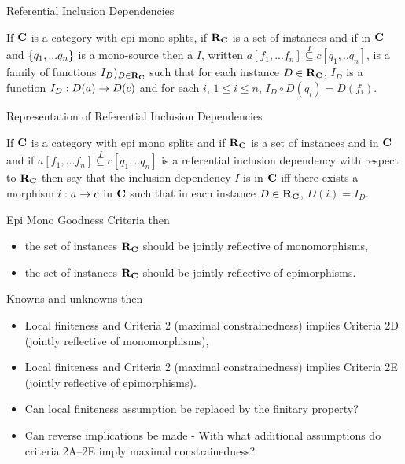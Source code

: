 \documentclass[xcolor=pst,dvips]{beamer}   %
\begin{document}
\begin{frame}{Referential Inclusion Dependencies}
\begin{definition}
If $\textbf{C}$ is a category with epi mono splits, if $\textbf{R}_{\textbf{C}}$ is a set of instances 
and if \fnsourceqnsource in $\textbf{C}$ and  $\left\{q_1,...q_n\right\}$ is a mono-source
 then a  $I$, written $a[f_1,...f_n] \overset{I}{\subseteq} c[q_1,..q_n]$, 
 is a family of functions $I_D)_{D \in \textbf{R}_{\textbf{C}}}$
such that for each instance $D \in \textbf{R}_{\textbf{C}}$, $I_D$ is a function $I_D : D(a) \rightarrow D(c)$ and
for each $i$, $1 \leq i \le n$, $I_D \circ D(q_i) = D(f_i)$.
\end{definition}
\end{frame}


\begin{frame}{Representation of Referential Inclusion Dependencies}
\begin{definition}
If $\textbf{C}$ is a category with epi mono splits 
and if $\textbf{R}_{\textbf{C}}$ is a set of instances
and \fnsourceqnsource in $\textbf{C}$ 
and if $a[f_1,...f_n] \overset{I}{\subseteq} c[q_1,..q_n]$ is a referential inclusion dependency
with respect  to $\textbf{R}_{\textbf{C}}$ 
then say that the inclusion dependency $I$ is  in $\textbf{C}$
iff there exists a morphism $i:a \rightarrow c$ in $\textbf{C}$ such that in each instance $D \in \textbf{R}_{\textbf{C}}$, $D(i) = I_D$. 
\end{definition}
\end{frame}

\begin{frame}{Epi Mono Goodness Criteria}
\IfSforepimonoCwithRCwords then
\begin{itemize}
\item {} the set of instances $\textbf{R}_{\textbf{C}}$ should be jointly reflective of monomorphisms,
\item {} the set of instances $\textbf{R}_{\textbf{C}}$ should be jointly reflective of epimorphisms.
\end{itemize}
\end{frame}

\begin{frame}{Knowns and unknowns}
\IfSforepimonoCwithRCwords then
\begin{itemize}
\item Local finiteness and Criteria 2 (maximal constrainedness) implies Criteria 2D (jointly reflective of monomorphisms),
\item Local finiteness and Criteria 2 (maximal constrainedness) implies Criteria 2E (jointly reflective of epimorphisms).
\item Can local finiteness assumption be replaced by the finitary property?
\item Can reverse implications be made - With what additional assumptions do criteria 2A--2E imply maximal constrainedness? 
\end{itemize}
\end{frame}


\iffalse
\begin{frame}{Bibliography}

\end{frame}
\fi

\end{document}
